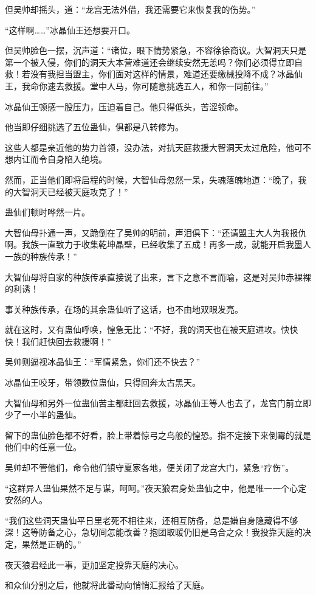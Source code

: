 \begin{this_body}
但吴帅却摇头，道：“龙宫无法外借，我还需要它来恢复我的伤势。”

“这样啊……”冰晶仙王还想要开口。

但吴帅脸色一摆，沉声道：“诸位，眼下情势紧急，不容徐徐商议。大智洞天只是第一个被入侵，你们的洞天大本营难道还会继续安然无恙吗？你们必须得立即自救！若没有我担当盟主，你们面对这样的情景，难道还要缴械投降不成？冰晶仙王，我命你速去救援。堂中人马，你可随意挑选五人，和你一同前往。”

冰晶仙王顿感一股压力，压迫着自己。他只得低头，苦涩领命。

他当即仔细挑选了五位蛊仙，俱都是八转修为。

这些人都是亲近他的势力首领，没办法，对抗天庭救援大智洞天太过危险，他可不想内讧而令自身陷入绝境。

然而，正当他们即将启程的时候，大智仙母忽然一呆，失魂落魄地道：“晚了，我的大智洞天已经被天庭攻克了！”

蛊仙们顿时哗然一片。

大智仙母扑通一声，又跪倒在了吴帅的明前，声泪俱下：“还请盟主大人为我报仇啊。我族一直致力于收集乾坤晶壁，已经收集了五成！再多一成，就能开启我墨人一族的种族传承！”

大智仙母将自家的种族传承直接说了出来，言下之意不言而喻，这是对吴帅赤裸裸的利诱！

事关种族传承，在场的其余蛊仙听了这话，也不由地双眼发亮。

就在这时，又有蛊仙呼唤，惶急无比：“不好，我的洞天也在被天庭进攻。快快快！我们赶快回去救援啊！”

吴帅则逼视冰晶仙王：“军情紧急，你们还不快去？”

冰晶仙王咬牙，带领数位蛊仙，只得回奔太古黑天。

大智仙母和另外一位蛊仙苦主都赶回去救援，冰晶仙王等人也去了，龙宫门前立即少了一小半的蛊仙。

留下的蛊仙脸色都不好看，脸上带着惊弓之鸟般的惶恐。指不定接下来倒霉的就是他们中的任意一位。

吴帅却不管他们，命令他们镇守夏家各地，便关闭了龙宫大门，紧急“疗伤”。

“这群异人蛊仙果然不足与谋，呵呵。”夜天狼君身处蛊仙之中，他是唯一一个心定安然的人。

“我们这些洞天蛊仙平日里老死不相往来，还相互防备，总是嫌自身隐藏得不够深！这等防备之心，急切间怎能改善？抱团取暖仍旧是乌合之众！我投靠天庭的决定，果然是正确的。”

夜天狼君经此一事，更加坚定投靠天庭的决心。

和众仙分别之后，他就将此番动向悄悄汇报给了天庭。


\end{this_body}
